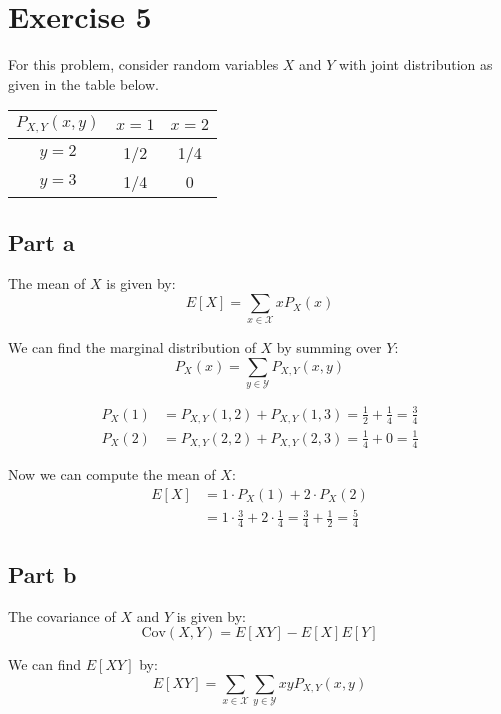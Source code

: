 \section{Exercise 5}
For this problem, consider random variables $X$ and $Y$ with joint distribution as given in the table below.

\begin{center}
	\begin{tabular}{c|cc}
		$P_{X,Y}(x,y)$ & $x = 1$ & $x = 2$ \\ \hline
		$y = 2$        & 1/2     & 1/4     \\
		$y = 3$        & 1/4     & 0
	\end{tabular}
\end{center}

\subsection{Part a}

The mean of $X$ is given by:
\[
	E[X] = \sum_{x\in\mathcal{X}}xP_X(x)
\]

We can find the marginal distribution of $X$ by summing over $Y$:
\[
	P_X(x) = \sum_{y\in\mathcal{Y}}P_{X,Y}(x,y)
\]

\begin{align*}
	P_X(1) & = P_{X,Y}(1,2) + P_{X,Y}(1,3) = \frac{1}{2} + \frac{1}{4} = \frac{3}{4} \\
	P_X(2) & = P_{X,Y}(2,2) + P_{X,Y}(2,3) = \frac{1}{4} + 0 = \frac{1}{4}
\end{align*}

Now we can compute the mean of $X$:
\begin{align*}
	E[X] & = 1\cdot P_X(1) + 2\cdot P_X(2)                                                   \\
	     & = 1\cdot\frac{3}{4} + 2\cdot\frac{1}{4} = \frac{3}{4} + \frac{1}{2} = \frac{5}{4}
\end{align*}

\subsection{Part b}

The covariance of $X$ and $Y$ is given by:
\[
	\text{Cov}(X,Y) = E[XY] - E[X]E[Y]
\]

We can find $E[XY]$ by:
\[
	E[XY] = \sum_{x\in\mathcal{X}}\sum_{y\in\mathcal{Y}}xyP_{X,Y}(x,y)
\]

